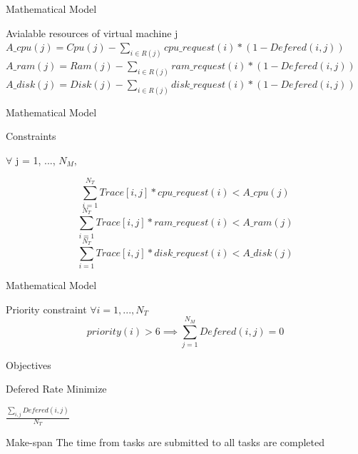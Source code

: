 \documentclass[10pt,xcolor={dvipsnames}, aspectratio=169]{beamer}
\begin{document}
\begin{frame}
	{Mathematical Model}
	\begin{block}
		{Avialable resources of virtual machine j}
		$A\_cpu(j) = Cpu(j) - \sum_{i \in R(j)}{cpu\_request(i)} * (1 - Defered(i, j))$\\ 
		$A\_ram(j) = Ram(j) - \sum_{i \in R(j)}{ram\_request(i)} * (1 - Defered(i, j))$ \\ 
		$A\_disk(j) = Disk(j) - \sum_{i \in R(j)}{disk\_request(i)} * (1 - Defered(i, j))$ \\ 
	\end{block}
\end{frame}

\begin{frame}
	{Mathematical Model}
	\begin{block}
		{Constraints} 
		\begin{center}
			$\forall$ j = 1, ..., $N_{M},$
		\end{center}
		\begin{equation*}
			\sum_{i = 1}^{N_{T}}{Trace[i, j] * cpu\_request(i)} < A\_cpu(j)
		\end{equation*}
		\begin{equation*}
			\sum_{i = 1}^{N_{T}}{Trace[i, j] * ram\_request(i)} < A\_ram(j)
		\end{equation*}
		\begin{equation*}
			\sum_{i = 1}^{N_{T}}{Trace[i, j] * disk\_request(i)} < A\_disk(j)
		\end{equation*}
	\end{block}
\end{frame}

\begin{frame}
	{Mathematical Model}
	\begin{block}
		{Priority constraint}
		$\forall i = 1, ..., N_{T}$
		\begin{equation*}
			priority(i) > 6 \implies \sum_{j = 1}^{N_{M}}{Defered(i, j)} = 0
		\end{equation*}
	\end{block}
\end{frame}

\begin{frame}
	{Objectives}
	\begin{block}
	{Defered Rate} 
	Minimize 
	\begin{center}
		$\frac{\sum_{i, j}{Defered(i, j)}}{N_{T}}$	
	\end{center}
	\end{block}
	
	\begin{block}
	{Make-span}
	The time from tasks are submitted to all tasks are completed
	\end{block}	
\end{frame}
\end{document}
